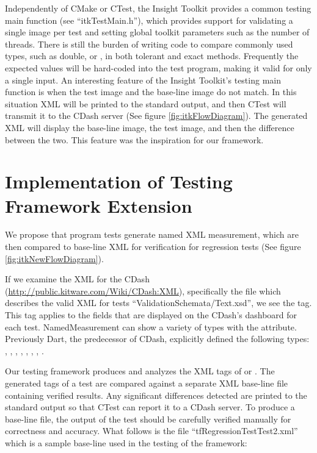 \documentclass{InsightArticle}
\begin{document}
Independently of CMake or CTest, the Insight Toolkit provides a common testing main function (see ``itkTestMain.h''), which provides support for validating a single image per test and setting global toolkit parameters such as the number of threads. There is still the burden of writing code to compare commonly used types, such as double,  or , in both tolerant and exact methods. Frequently the expected values will be hard-coded into the test program, making it valid for only a single input. An interesting feature of the Insight Toolkit's testing main function is when the test image and the base-line image do not match.  In this situation XML will be printed to the standard output, and then CTest will transmit it to the CDash server (See figure \ref{fig:itkFlowDiagram}). The generated XML will display the base-line image, the test image, and then the difference between the two. This feature was the inspiration for our framework.

\section{Implementation of Testing Framework Extension}



We propose that program tests generate named XML measurement, which are then compared to base-line XML for verification for regression tests (See figure \ref{fig:itkNewFlowDiagram}).

If we examine the XML for the CDash (\url{http://public.kitware.com/Wiki/CDash:XML}), specifically the file which describes the valid XML for tests ``ValidationSchemata/Text.xsd'', we see the  tag. This tag applies to the fields that are displayed on the CDash's dashboard for each test. NamedMeasurement can show a variety of types with the  attribute. Previously Dart, the predecessor of CDash, explicitly defined the following types: , , , , , , , . 


Our testing framework produces and analyzes the XML tags of  or . The generated tags of a test are compared against a separate XML base-line file containing verified results. Any significant differences detected are printed to the standard output so that CTest can report it to a CDash server. To produce a base-line file, the output of the test should be carefully verified manually for correctness and accuracy. What follows is the file ``tfRegressionTestTest2.xml'' which is a sample base-line used in the testing of the framework:
\end{document}
